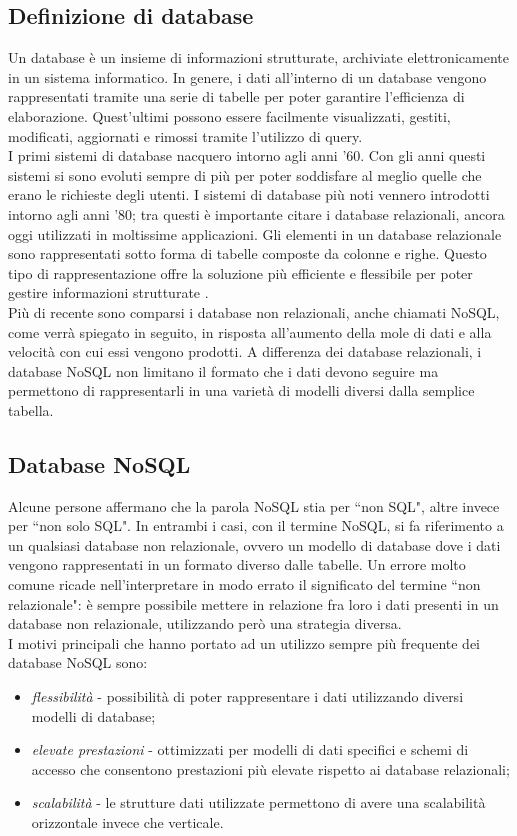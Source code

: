 \subsection{Definizione di database}
Un database è un insieme di informazioni strutturate, archiviate elettronicamente in un sistema informatico. In genere, i dati all'interno di un database vengono rappresentati tramite una serie di tabelle per poter garantire l'efficienza di elaborazione. Quest'ultimi possono essere facilmente visualizzati, gestiti, modificati, aggiornati e rimossi tramite l'utilizzo di query. \\
I primi sistemi di database nacquero intorno agli anni '60. Con gli anni questi sistemi si sono evoluti sempre di più per poter soddisfare al meglio quelle che erano le richieste degli utenti. I sistemi di database più noti vennero introdotti intorno agli anni '80; tra questi è importante citare i database relazionali, ancora oggi utilizzati in moltissime applicazioni. Gli elementi in un database relazionale sono rappresentati sotto forma di tabelle composte da colonne e righe. Questo tipo di rappresentazione offre la soluzione più efficiente e flessibile per poter gestire informazioni strutturate \cite{oracle}. \\
Più di recente sono comparsi i database non relazionali, anche chiamati NoSQL, come verrà spiegato in seguito, in risposta all'aumento della mole di dati e alla velocità con cui essi vengono prodotti. A differenza dei database relazionali, i database NoSQL non limitano il formato che i dati devono seguire ma permettono di rappresentarli in una varietà di modelli diversi dalla semplice tabella.

\subsection{Database NoSQL}
Alcune persone affermano che la parola NoSQL stia per “non SQL", altre invece per “non solo SQL".  In entrambi i casi, con il termine NoSQL, si fa riferimento a un qualsiasi database non relazionale, ovvero un modello di database dove i dati vengono rappresentati in un formato diverso dalle tabelle. Un errore molto comune ricade nell'interpretare in modo errato il significato del termine “non relazionale": è sempre possibile mettere in relazione fra loro i dati presenti in un database non relazionale, utilizzando però una strategia diversa.\\
I motivi principali che hanno portato ad un utilizzo sempre più frequente dei database NoSQL sono:
\begin{itemize}
    
    \item \textit{flessibilità} - possibilità di poter rappresentare i dati utilizzando diversi modelli di database;
    \item \textit{elevate prestazioni} - ottimizzati per modelli di dati specifici e schemi di accesso che consentono prestazioni più elevate rispetto ai database relazionali;
    \item \textit{scalabilità} - le strutture dati utilizzate permettono di avere una scalabilità orizzontale invece che verticale.

\end{itemize}
